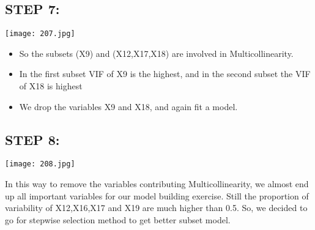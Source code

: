 \documentclass[a4paper,12pt,twoside]{book}
\begin{document}
\subsection*{STEP 7:}
\begin{center}
\texttt{[image: 207.jpg]}\\
\end{center}
\begin{itemize}
\item So the subsets (X9) and (X12,X17,X18) are involved in Multicollinearity.\\
\item In the first subset VIF of X9 is the highest, and in the second subset the VIF of X18 is highest\\
\item We drop the variables X9 and X18, and again fit a model.\\
\end{itemize}
\subsection*{STEP 8:}
\begin{center}
\texttt{[image: 208.jpg]}\\
\end{center}
In this way to remove the variables contributing Multicollinearity, we almost end up all important variables for our model building exercise. Still the proportion of variability of X12,X16,X17 and X19 are much higher than 0.5. So, we decided to go for stepwise selection method to get better subset model.
\newpage
\end{document}
